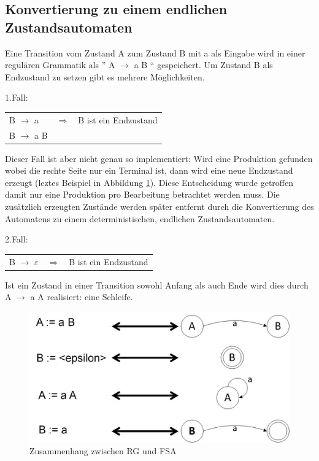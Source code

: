 \subsection{Konvertierung zu einem endlichen Zustandsautomaten}

Eine Transition vom Zustand A zum Zustand B mit a als Eingabe wird in einer
regulären Grammatik als '' A $\rightarrow$ a B `` gespeichert.
Um Zustand B als Endzustand zu setzen gibt es mehrere Möglichkeiten.

1.Fall:

\begin{tabular}{lcr}
B $\rightarrow$ a & $\Longrightarrow$ & B ist ein Endzustand\\
B $\rightarrow$ a B\\
\end{tabular}

Dieser Fall ist aber nicht genau so implementiert: Wird eine Produktion gefunden
wobei die rechte Seite nur ein Terminal ist, dann wird eine neue Endzustand
erzeugt (leztes Beispiel in Abbildung \ref{fig:convGrammar}). Diese Entscheidung
wurde getroffen damit nur eine Produktion pro Bearbeitung betrachtet werden
muss. Die zusätzlich erzeugten Zustände werden später entfernt durch die
Konvertierung des Automatens zu einem deterministischen, endlichen
Zustandsautomaten.

2.Fall:

\begin{tabular}{lcr}
B $\rightarrow$ $\varepsilon$ & $\Longrightarrow$ & B ist ein Endzustand\\
\end{tabular}

Ist ein Zustand in einer Transition sowohl Anfang als auch Ende wird dies durch
A $\rightarrow$ a A realisiert: eine Schleife.

\begin{figure}[h]
  \begin{center}
  \includegraphics[scale = 0.4]{objectsToInclude/convGram.jpg}
  \caption{Zusammenhang zwischen RG und FSA}
  \label{fig:convGrammar}
  \end{center}
\end{figure}

